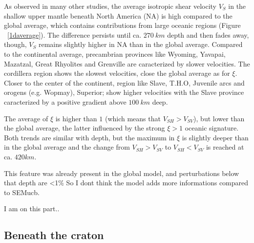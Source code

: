 \documentclass[12pt]{article}
\begin{document}
As observed in many other studies, the average isotropic shear velocity $V_S$ in the shallow upper mantle beneath North America (NA) is high compared to the global average, which contains contributions from large oceanic regions (Figure ~\ref{1daverage}). 
The difference persists until ca. $270 \: km$ depth and then fades away, though, $V_S$ remains slightly higher in NA than in the global average. 
Compared to the continental average, precambrian provinces like Wyoming, Yavapai, Mazatzal, Great Rhyolites and Grenville are caracterized by slower velocities. 
The cordillera region shows the slowest velocities, close the global average as for $\xi$. 
Closer to the center of the continent, region like Slave, T.H.O, Juvenile arcs and orogens (e.g. Wopmay), Superior; show higher velocities with the Slave province caracterized by a positive gradient above $100 \: km$ deep.


The average of $\xi$ is higher than $1$ (which means that $V_{SH} > V_{SV}$), but lower than the global average, the latter influenced by the strong $\xi > 1$ oceanic signature.
Both trends are similar with depth, but the maximum in $\xi$ is slightly deeper than in the global average and the change from $V_{SH} > V_{SV}$ to $V_{SH} < V_{SV}$ is reached at ca. $420km$. 

{\color{red} This feature was already present in the global model, and perturbations below that depth are <1\% So I dont think the model adds more informations compared to SEMucb}.

I am on this part..

\subsection{Beneath the craton}
\end{document}
